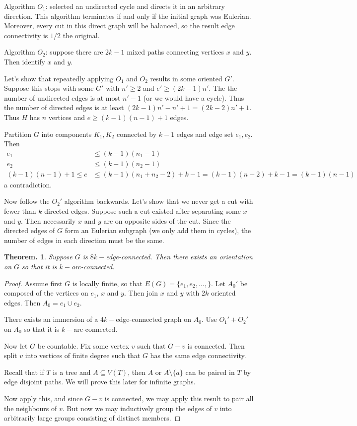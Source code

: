 \documentclass[11pt, a4paper]{memoir}
\theoremstyle{change}
\newtheorem{theorem}{Theorem.}[section]
\theoremstyle{plain}
\theoremstyle{nonumberplain}
\newtheorem{proof}{Proof}
\numberwithin{equation}{section}
\begin{document}
Algorithm $O_1$: selected an undirected cycle and directs it in an arbitrary direction.
This algorithm terminates if and only if the initial graph was Eulerian.
Moreover, every cut in this direct graph will be balanced, so the result edge connectivity is $1/2$ the original.

Algorithm $O_2$: suppose there are $2k-1$ mixed paths connecting vertices $x$ and $y$.
Then identify $x$ and $y$.

Let's show that repeatedly applying $O_1$ and $O_2$ results in some oriented $G'$.
Suppose this stops with some $G'$ with $n'\geq 2$ and $e'\geq(2k-1)n'$.
The the number of undirected edges is at most $n'-1$ (or we would have a cycle).
Thus the number of directed edges is at least $(2k-1)n'-n'+1=(2k-2)n'+1$.
Thus $H$ has $n$ vertices and $e\geq(k-1)(n-1)+1$ edges.

Partition $G$ into components $K_1,K_2$ connected by $k-1$ edges and edge set $e_1,e_2$.
Then
\begin{align*}
    e_1 &\leq (k-1)(n_1-1)\\
    e_2 &\leq (k-1)(n_2-1)\\
    (k-1)(n-1)+1 \leq e &\leq (k-1)(n_1+n_2-2)+k-1=(k-1)(n-2)+k-1=(k-1)(n-1)
\end{align*}
a contradiction.

Now follow the $O_2'$ algorithm backwards.
Let's show that we never get a cut with fewer than $k$ directed edges.
Suppose such a cut existed after separating some $x$ and $y$.
Then necessarily $x$ and $y$ are on opposite sides of the cut.
Since the directed edges of $G$ form an Eulerian subgraph (we only add them in cycles), the number of edges in each direction must be the same.

\begin{theorem}
    Suppose $G$ is $8k-$edge-connected.
    Then there exists an orientation on $G$ so that it is $k-$arc-connected.
\end{theorem}
\begin{proof}
    Assume first $G$ is locally finite, so that $E(G)=\{e_1,e_2,\ldots,\}$.
    Let $A_0'$ be composed of the vertices on $e_1$, $x$ and $y$.
    Then join $x$ and $y$ with $2k$ oriented edges.
    Then $A_0=e_1\cup e_2$.

    There exists an immersion of a $4k-$edge-connected graph on $A_0$.
    Use $O_1'+O_2'$ on $A_0$ so that it is $k-$arc-connected.

    Now let $G$ be countable.
    Fix some vertex $v$ such that $G-v$ is connected.
    Then split $v$ into vertices of finite degree such that $G$ has the same edge connectivity.

    Recall that if $T$ is a tree and $A\subseteq V(T)$, then $A$ or $A\setminus\{a\}$ can be paired in $T$ by edge disjoint paths.
    We will prove this later for infinite graphs.

    Now apply this, and since $G-v$ is connected, we may apply this result to pair all the neighbours of $v$.
    But now we may inductively group the edges of $v$ into arbitrarily large groups consisting of distinct members.
\end{proof}
\end{document}
